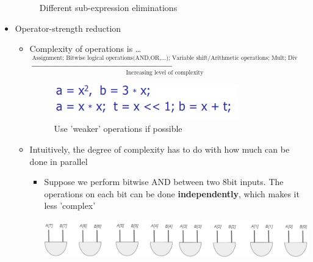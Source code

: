 \documentclass{article}
\begin{document}
\begin{itemize}
        \begin{figure}[htp]%
            \centering
            \qquad
            \caption{Different sub-expression eliminations}%
        \end{figure}
    \item Operator-strength reduction
        \begin{itemize}
            \item Complexity of operations is \dots $\xrightarrow[\text{Increasing level of complexity}]
                                                                 {\text{Assignment; Bitwise logical operations(AND,OR,...); Variable shift/Arithmetic operations; Mult; Div}}$
            \begin{figure}[htp]
                \centering
                \includegraphics[width=8cm, scale=1]{S2/operatorStrengthReduction.PNG}
                \caption{Use 'weaker' operations if possible}
            \end{figure}
            \item Intuitively, the degree of complexity has to do with how much can be done in parallel
                \begin{itemize}
                    \item Suppose we perform bitwise AND between two 8bit inputs.
                            The operations on each bit can be done \textbf{independently}, which makes it less 'complex'

                        \begin{minipage}{\linewidth}
                            \centering
                            \includegraphics[width=14cm, scale=1]{S2/8bit_AND.PNG}
                        \end{minipage}


\end{itemize}
\end{itemize}
\end{itemize}
\end{document}
